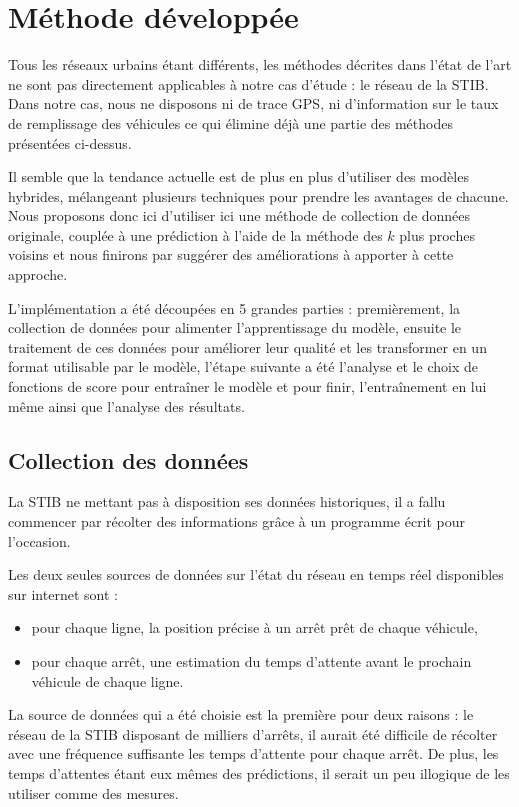 \documentclass[letterpaper]{article}
\begin{document}
\section{Méthode développée}

Tous les réseaux urbains étant différents, les méthodes décrites dans l'état de l'art ne sont pas directement applicables à notre cas d'étude : le réseau de la STIB. Dans notre cas, nous ne disposons ni de trace GPS, ni d'information sur le taux de remplissage des véhicules ce qui élimine déjà une partie des méthodes présentées ci-dessus.

Il semble que la tendance actuelle est de plus en plus d'utiliser des modèles hybrides, mélangeant plusieurs techniques pour prendre les avantages de chacune. Nous proposons donc ici d'utiliser ici une méthode de collection de données originale, couplée à une prédiction à l'aide de la méthode des $k$ plus proches voisins et nous finirons par suggérer des améliorations à apporter à cette approche.

L'implémentation a été découpées en 5 grandes parties : premièrement, la collection de données pour alimenter l'apprentissage du modèle, ensuite le traitement de ces données pour améliorer leur qualité et les transformer en un format utilisable par le modèle, l'étape suivante a été l'analyse et le choix de fonctions de score pour entraîner le modèle et pour finir, l’entraînement en lui même ainsi que l'analyse des résultats.

\subsection{Collection des données}

La STIB ne mettant pas à disposition ses données historiques, il a fallu commencer par récolter des informations grâce à un programme écrit pour l'occasion.

Les deux seules sources de données sur l'état du réseau en temps réel disponibles sur internet sont :
\begin{itemize}
    \item pour chaque ligne, la position précise à un arrêt prêt de chaque véhicule,
    \item pour chaque arrêt, une estimation du temps d'attente avant le prochain véhicule de chaque ligne.
\end{itemize}
\vspace{0.5em}
La source de données qui a été choisie est la première pour deux raisons : le réseau de la STIB disposant de milliers d'arrêts, il aurait été difficile de récolter avec une fréquence suffisante les temps d'attente pour chaque arrêt. De plus, les temps d'attentes étant eux mêmes des prédictions, il serait un peu illogique de les utiliser comme des mesures.
\end{document}

